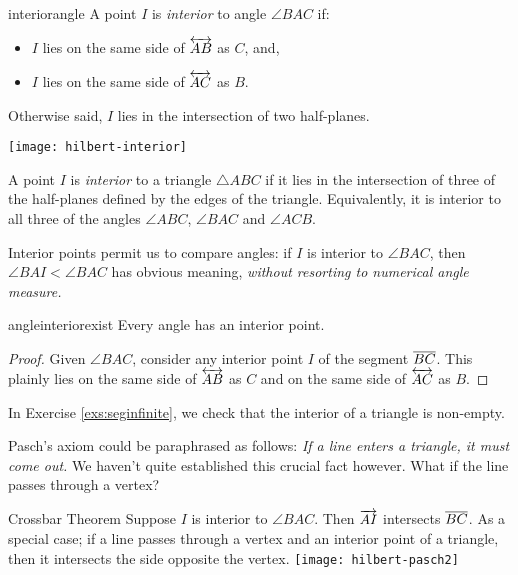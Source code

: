 \begin{defn}{}{interiorangle}
	A point $I$ is \emph{interior} to angle $\angle BAC$ if:\par
	\begin{minipage}[t]{0.7\linewidth}\vspace{-3pt}
	\begin{itemize}%
	  \item $I$ lies on the same side of $\overleftrightarrow{AB}$ as $C$, and,
	  \item $I$ lies on the same side of $\overleftrightarrow{AC}$ as $B$.
	\end{itemize}
	Otherwise said, $I$ lies in the intersection of two half-planes.
	\end{minipage}
	\hfill
	\begin{minipage}[t]{0.29\linewidth}\vspace{-12pt}
		\flushright
		\texttt{[image: hilbert-interior]}
	\end{minipage}
	\bigbreak
	A point $I$ is \emph{interior} to a triangle $\triangle ABC$ if it lies in the intersection of three of the half-planes defined by the edges of the triangle. Equivalently, it is interior to all three of the angles $\angle ABC$, $\angle BAC$ and $\angle ACB$.
\end{defn}

Interior points permit us to compare angles: if $I$ is interior to $\angle BAC$, then $\angle BAI<\angle BAC$ has obvious meaning, \emph{without resorting to numerical angle measure.}

\begin{cor}{}{angleinteriorexist}
	Every angle has an interior point.
\end{cor}

\begin{proof}
	Given $\angle BAC$, consider any interior point $I$ of the segment $\overline{BC}$. This plainly lies on the same side of $\overleftrightarrow{AB}$ as $C$ and on the same side of $\overleftrightarrow{AC}$ as $B$.
\end{proof}

In Exercise \ref{exs:seginfinite}, we check that the interior of a triangle is non-empty.

\goodbreak

Pasch's axiom could be paraphrased as follows: \emph{If a line enters a triangle, it must come out.} We haven't quite established this crucial fact however. What if the line passes through a vertex?
 
\begin{thm}[lower separated=false, sidebyside, sidebyside align=top seam, sidebyside gap=0pt, righthand width=0.3\linewidth]{Crossbar Theorem}{}
	Suppose $I$ is interior to $\angle BAC$. Then $\overrightarrow{AI}$ intersects $\overline{BC}$.\medbreak
As a special case; if a line passes through a vertex and an interior point of a triangle, then it intersects the side opposite the vertex.
	\tcblower
	\flushright
	\texttt{[image: hilbert-pasch2]}
\end{thm}


